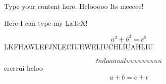 \documentclass{article}
\begin{document}
Type your content here. Helooooo Its meeeee!

Here I can type my LaTeX!

$$a^2 + b^2 = c^2$$
LKFHAWLEFJNLECIUHWELIUCHLIUAHLIU

\[
tadaaaaaluuuuuuuuu
\]
erereui
heloo
\begin{align}
    a+b=c + t
\end{align}
\end{document}
